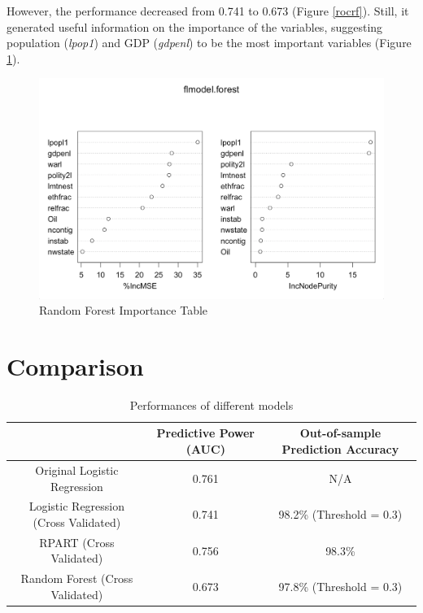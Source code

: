 \documentclass{article}
\begin{document}
However, the performance decreased from 0.741 to 0.673 (Figure \ref{rocrf}). Still, it generated useful information on the importance of the variables, suggesting population (\textit{lpop1}) and GDP (\textit{gdpenl}) to be the most important variables (Figure \ref{rf}). 

\begin{figure}[h!]
    \centering
    \includegraphics[width=\linewidth]{rf.png}
    \caption{Random Forest Importance Table}
    \label{rf}
\end{figure}

\section{Comparison}


\begin{table}[h!]
\centering
\caption{Performances of different models}
\label{my-label}
\begin{tabular}{|c|c|c|}
\hline
                                      & Predictive Power (AUC) & Out-of-sample Prediction Accuracy \\ \hline
Original Logistic Regression          & 0.761                               & N/A                                    \\ \hline
Logistic Regression (Cross Validated) & 0.741                               & 98.2\% (Threshold = 0.3)               \\ \hline
RPART (Cross Validated)               & 0.756                               & 98.3\%                                 \\ \hline
Random Forest (Cross Validated)       & 0.673                               & 97.8\% (Threshold = 0.3)               \\ \hline
\end{tabular}
\end{table}
\end{document}
